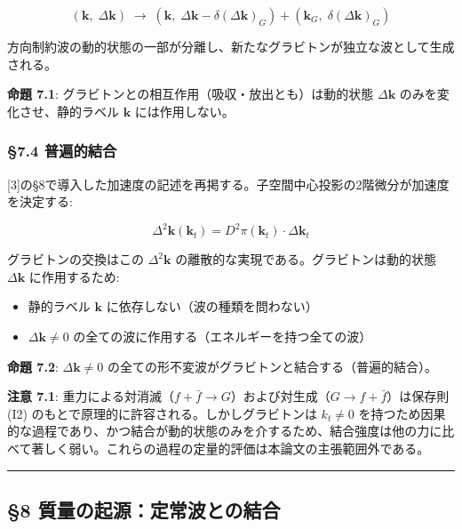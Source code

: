 \documentclass[
  a4paper,11pt]{ltjsarticle}
\providecommand{\tightlist}{%
  \setlength{\itemsep}{0pt}\setlength{\parskip}{0pt}}
\theoremstyle{definition}
\theoremstyle{remark}
\begin{document}
\[(\mathbf{k},\; \Delta\mathbf{k}) \;\longrightarrow\; (\mathbf{k},\; \Delta\mathbf{k} - \delta(\Delta\mathbf{k})_G) + (\mathbf{k}_G,\; \delta(\Delta\mathbf{k})_G)\]

方向制約波の動的状態の一部が分離し、新たなグラビトンが独立な波として生成される。

\textbf{命題 7.1}: グラビトンとの相互作用（吸収・放出とも）は動的状態
\(\Delta\mathbf{k}\) のみを変化させ、静的ラベル \(\mathbf{k}\)
には作用しない。

\subsubsection{§7.4 普遍的結合}\label{ux666eux904dux7684ux7d50ux5408}

{[}3{]}の§8で導入した加速度の記述を再掲する。子空間中心投影の2階微分が加速度を決定する:

\[\Delta^2\mathbf{k}(\mathbf{k}_t) = D^2\pi(\mathbf{k}_t) \cdot \Delta\mathbf{k}_t\]

グラビトンの交換はこの \(\Delta^2\mathbf{k}\)
の離散的な実現である。グラビトンは動的状態 \(\Delta\mathbf{k}\)
に作用するため:

\begin{itemize}
\tightlist
\item
  静的ラベル \(\mathbf{k}\) に依存しない（波の種類を問わない）
\item
  \(\Delta\mathbf{k} \neq 0\)
  の全ての波に作用する（エネルギーを持つ全ての波）
\end{itemize}

\textbf{命題 7.2}: \(\Delta\mathbf{k} \neq 0\)
の全ての形不変波がグラビトンと結合する（普遍的結合）。

\textbf{注意 7.1}:
重力による対消滅（\(f + \bar{f} \to G\)）および対生成（\(G \to f + \bar{f}\)）は保存則
(I2) のもとで原理的に許容される。しかしグラビトンは \(k_t \neq 0\)
を持つため因果的な過程であり、かつ結合が動的状態のみを介するため、結合強度は他の力に比べて著しく弱い。これらの過程の定量的評価は本論文の主張範囲外である。

\begin{center}\rule{0.5\linewidth}{0.5pt}\end{center}

\subsection{§8
質量の起源：定常波との結合}\label{ux8ceaux91cfux306eux8d77ux6e90ux5b9aux5e38ux6ce2ux3068ux306eux7d50ux5408}
\end{document}
